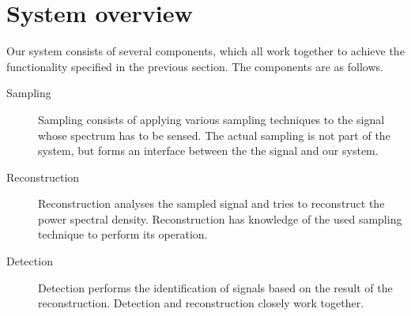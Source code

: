 \documentclass[a4paper, openany, oneside]{memoir}
\begin{document}











\section{System overview}
\label{sec:theory-system-overview}
Our system consists of several components, which all work together to achieve the functionality specified in the previous section. The components are as follows.

\begin{description}
    \item[Sampling] Sampling consists of applying various sampling techniques to the signal whose spectrum has to be sensed. The actual sampling is not part of the system, but forms an interface between the the signal and our system.
    \item[Reconstruction] Reconstruction analyses the sampled signal and tries to reconstruct the power spectral density. Reconstruction has knowledge of the used sampling technique to perform its operation.
    \item[Detection] Detection performs the identification of signals based on the result of the reconstruction. Detection and reconstruction closely work together.
\end{description}
\end{document}
